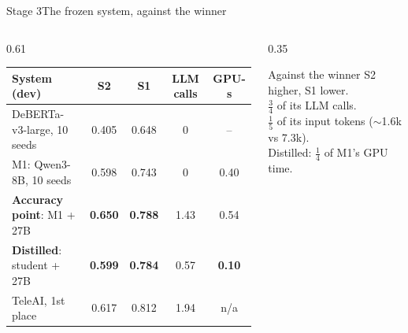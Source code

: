 \documentclass[aspectratio=169,10pt]{beamer}
\newcommand{\hl}[1]{\textcolor{accent}{\textbf{#1}}}
\begin{document}
\begin{frame}{Stage 3\quad The frozen system, against the winner}
  \vfill
  \begin{columns}[c]
    \begin{column}{0.61\textwidth}
      \small
      \renewcommand{\arraystretch}{1.35}\setlength{\tabcolsep}{3pt}
      \begin{tabular}{@{}lcccc@{}}
        \toprule
        System (dev) & S2 & S1 & LLM calls & GPU-s \\
        \midrule
        DeBERTa-v3-large, 10 seeds & 0.405 & 0.648 & 0 & -- \\
        M1: Qwen3-8B, 10 seeds & 0.598 & 0.743 & 0 & 0.40 \\
        \textbf{Accuracy point}: M1 + 27B & \hl{0.650} & \textbf{0.788} & 1.43 & 0.54 \\
        \textbf{Distilled}: student + 27B & \textbf{0.599} & \textbf{0.784} & 0.57 & \textbf{0.10} \\
        \midrule
        TeleAI, 1st place & 0.617 & 0.812 & 1.94 & n/a \\
        \bottomrule
      \end{tabular}
    \end{column}
    \begin{column}{0.35\textwidth}
      {
      \begin{block}{Against the winner}
        \small
        S2 higher, S1 lower.\\
        $\tfrac34$ of its LLM calls.\\
        $\tfrac15$ of its input tokens (${\sim}$1.6k vs 7.3k).\\
        Distilled: $\tfrac14$ of M1's GPU time.
      \end{block}}
    \end{column}
  \end{columns}
  \vfill
\end{frame}
\end{document}
